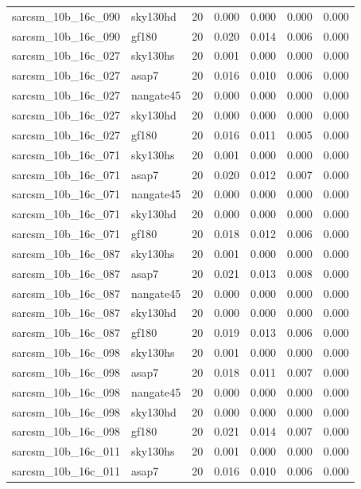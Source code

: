 \begin{tabular}{llrrrrr}
sarcsm\_10b\_16c\_090 & sky130hd & 20 & 0.000 & 0.000 & 0.000 & 0.000 \\
sarcsm\_10b\_16c\_090 & gf180 & 20 & 0.020 & 0.014 & 0.006 & 0.000 \\
sarcsm\_10b\_16c\_027 & sky130hs & 20 & 0.001 & 0.000 & 0.000 & 0.000 \\
sarcsm\_10b\_16c\_027 & asap7 & 20 & 0.016 & 0.010 & 0.006 & 0.000 \\
sarcsm\_10b\_16c\_027 & nangate45 & 20 & 0.000 & 0.000 & 0.000 & 0.000 \\
sarcsm\_10b\_16c\_027 & sky130hd & 20 & 0.000 & 0.000 & 0.000 & 0.000 \\
sarcsm\_10b\_16c\_027 & gf180 & 20 & 0.016 & 0.011 & 0.005 & 0.000 \\
sarcsm\_10b\_16c\_071 & sky130hs & 20 & 0.001 & 0.000 & 0.000 & 0.000 \\
sarcsm\_10b\_16c\_071 & asap7 & 20 & 0.020 & 0.012 & 0.007 & 0.000 \\
sarcsm\_10b\_16c\_071 & nangate45 & 20 & 0.000 & 0.000 & 0.000 & 0.000 \\
sarcsm\_10b\_16c\_071 & sky130hd & 20 & 0.000 & 0.000 & 0.000 & 0.000 \\
sarcsm\_10b\_16c\_071 & gf180 & 20 & 0.018 & 0.012 & 0.006 & 0.000 \\
sarcsm\_10b\_16c\_087 & sky130hs & 20 & 0.001 & 0.000 & 0.000 & 0.000 \\
sarcsm\_10b\_16c\_087 & asap7 & 20 & 0.021 & 0.013 & 0.008 & 0.000 \\
sarcsm\_10b\_16c\_087 & nangate45 & 20 & 0.000 & 0.000 & 0.000 & 0.000 \\
sarcsm\_10b\_16c\_087 & sky130hd & 20 & 0.000 & 0.000 & 0.000 & 0.000 \\
sarcsm\_10b\_16c\_087 & gf180 & 20 & 0.019 & 0.013 & 0.006 & 0.000 \\
sarcsm\_10b\_16c\_098 & sky130hs & 20 & 0.001 & 0.000 & 0.000 & 0.000 \\
sarcsm\_10b\_16c\_098 & asap7 & 20 & 0.018 & 0.011 & 0.007 & 0.000 \\
sarcsm\_10b\_16c\_098 & nangate45 & 20 & 0.000 & 0.000 & 0.000 & 0.000 \\
sarcsm\_10b\_16c\_098 & sky130hd & 20 & 0.000 & 0.000 & 0.000 & 0.000 \\
sarcsm\_10b\_16c\_098 & gf180 & 20 & 0.021 & 0.014 & 0.007 & 0.000 \\
sarcsm\_10b\_16c\_011 & sky130hs & 20 & 0.001 & 0.000 & 0.000 & 0.000 \\
sarcsm\_10b\_16c\_011 & asap7 & 20 & 0.016 & 0.010 & 0.006 & 0.000 \\

\end{tabular}
